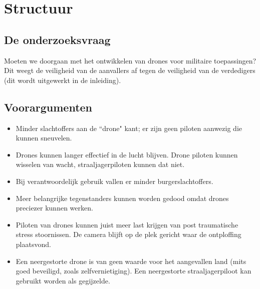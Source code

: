 \section{Structuur}
\subsection{De onderzoeksvraag}
Moeten we doorgaan met het ontwikkelen van drones voor militaire toepassingen?
Dit weegt de veiligheid van de aanvallers af tegen de veiligheid van de verdedigers (dit wordt uitgewerkt in de inleiding).

\subsection{Voorargumenten}

\begin{itemize}

\item
Minder slachtoffers aan de ``drone" kant; er zijn geen piloten aanwezig die kunnen sneuvelen.

\item
Drones kunnen langer effectief in de lucht blijven. Drone piloten kunnen wisselen van wacht, straaljagerpiloten kunnen dat niet.

\item
Bij verantwoordelijk gebruik vallen er minder burgerslachtoffers.

\item
Meer belangrijke tegenstanders kunnen worden gedood omdat drones preciezer kunnen werken.

\item
Piloten van drones kunnen juist meer last krijgen van post traumatische stress stoornissen. De camera blijft op de plek gericht waar de ontploffing plaatsvond.

\item
Een neergestorte drone is van geen waarde voor het aangevallen land (mits goed beveiligd, zoals zelfvernietiging). Een neergestorte straaljagerpiloot kan gebruikt worden als gegijzelde.

\end{itemize}

